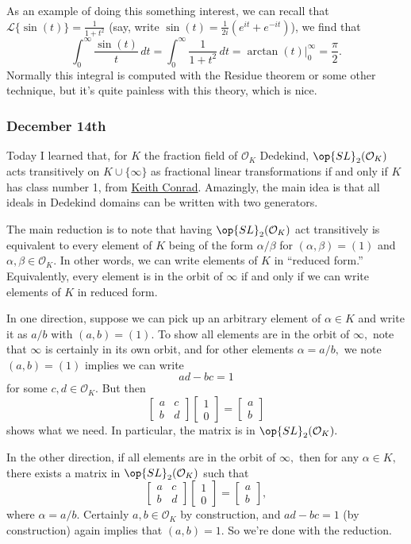 As an example of doing this something interest, we can recall that $\mathcal L\{\sin(t)\}=\frac1{1+t^2}$ (say, write $\sin(t)=\frac1{2i}\left(e^{it}+e^{-it}\right)$), we find that
\[\int_0^\infty\frac{\sin(t)}t\,dt=\int_0^\infty\frac1{1+t^2}\,dt=\arctan(t)\bigg|_0^\infty=\frac\pi2.\]
Normally this integral is computed with the Residue theorem or some other technique, but it's quite painless with this theory, which is nice.

\subsubsection{December 14th}
Today I learned that, for $K$ the fraction field of $\mathcal O_K$ Dedekind, $\op{SL}_2(\mathcal O_K)$ acts transitively on $K\cup\{\infty\}$ as fractional linear transformations if and only if $K$ has class number 1, from \href{https://kconrad.math.uconn.edu/blurbs/gradnumthy/SL2classno.pdf}{Keith Conrad}. Amazingly, the main idea is that all ideals in Dedekind domains can be written with two generators.

The main reduction is to note that having $\op{SL}_2(\mathcal O_K)$ act transitively is equivalent to every element of $K$ being of the form $\alpha/\beta$ for $(\alpha,\beta)=(1)$ and $\alpha,\beta\in\mathcal O_K.$ In other words, we can write elements of $K$ in ``reduced form.'' Equivalently, every element is in the orbit of $\infty$ if and only if we can write elements of $K$ in reduced form.

In one direction, suppose we can pick up an arbitrary element of $\alpha\in K$ and write it as $a/b$ with $(a,b)=(1).$ To show all elements are in the orbit of $\infty,$ note that $\infty$ is certainly in its own orbit, and for other elements $\alpha=a/b,$ we note $(a,b)=(1)$ implies we can write
\[ad-bc=1\]
for some $c,d\in\mathcal O_K.$ But then
\[\begin{bmatrix}
    a & c \\
    b & d
\end{bmatrix}\begin{bmatrix} 1 \\ 0 \end{bmatrix} = \begin{bmatrix} a \\ b \end{bmatrix}\]
shows what we need. In particular, the matrix is in $\op{SL}_2(\mathcal O_K).$

In the other direction, if all elements are in the orbit of $\infty,$ then for any $\alpha\in K,$ there exists a matrix in $\op{SL}_2(\mathcal O_K)$ such that
\[\begin{bmatrix}
    a & c \\
    b & d
\end{bmatrix}\begin{bmatrix} 1 \\ 0 \end{bmatrix} = \begin{bmatrix} a \\ b \end{bmatrix},\]
where $\alpha=a/b.$ Certainly $a,b\in\mathcal O_K$ by construction, and $ad-bc=1$ (by construction) again implies that $(a,b)=1.$ So we're done with the reduction.

